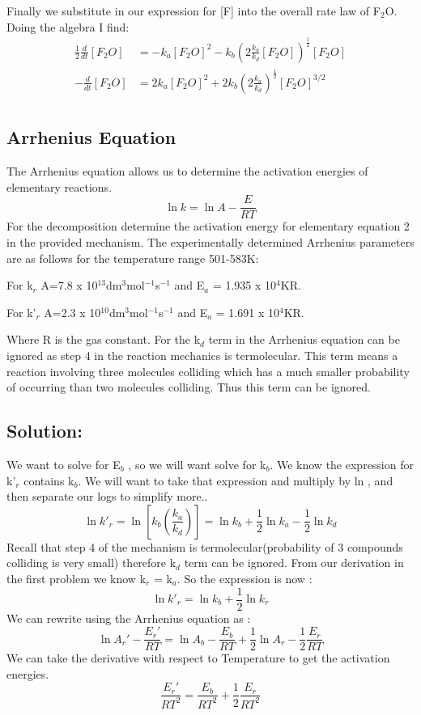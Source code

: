 \documentclass{article}
\newcommand{\be}{\begin{equation}}
\newcommand{\ee}{\end{equation}}
\begin{document}
Finally we substitute in our expression for [F] into the overall rate law of F$_2$O.  
Doing the algebra I find:
\be
\begin{split}
\frac{1}{2}\frac{d}{dt}[F_2O] &= -k_a[F_2O]^2 - k_b\left(2\frac{k_a}{k_d}[F_2O]\right)^{\frac{1}{2}} [F_2O] \\
-\frac{d}{dt}[F_2O] &= 2k_a[F_2O]^2 + 2k_b\left(2\frac{k_a}{k_d}\right)^{\frac{1}{2}} [F_2O]^{3/2} \\
\end{split}
\ee

\subsection{Arrhenius Equation}
The Arrhenius equation allows us to determine the activation energies of elementary reactions. 
\be
\ln k = \ln A -\frac{E}{RT}
\ee
For the decomposition determine the activation energy for elementary equation 2 in the provided mechanism. 
 The experimentally determined Arrhenius parameters are as follows for the temperature range 501-583K: 

\bigskip

For k$_r$ A=7.8 x 10$^{13}$dm$^3$mol$^{-1}$s$^{-1}$ and E$_a$ = 1.935 x 10$^4$KR. 

\bigskip

For k'$_r$ A=2.3 x 10$^{10}$dm$^3$mol$^{-1}$s$^{-1}$ and E$_a$ = 1.691 x 10$^4$KR. 

Where R is the gas constant.  
For the k$_d$ term in the Arrhenius equation can be ignored as step 4 in the reaction mechanics is termolecular. This term means a reaction involving three molecules colliding which has a much smaller probability of occurring than two molecules colliding. Thus this term can be ignored. 
\subsection*{Solution:}
We want to solve for E$_b$ , so we will want solve for k$_b$. We know the expression for k'$_r$ contains k$_b$. 
We will want to take that expression and multiply by ln , and then  separate our logs to simplify more..
\be
\ln k'_r = \ln \left[k_b\left(\frac{k_a}{k_d}\right)\right] = \ln k_b +\frac{1}{2}\ln k_a - \frac{1}{2}\ln k_d 
\ee
Recall that step 4 of the mechanism is termolecular(probability of 3 compounds colliding is very small) therefore k$_d$ term can be ignored. From our derivation in the first problem we know k$_r$ = k$_a$. So the expression is now : 
\be
\ln k'_r = \ln k_b +\frac{1}{2}\ln k_r
\ee
We can rewrite using the Arrhenius equation as : 
\be
\ln A_r'- \frac{E_r'}{RT}=\ln A_b - \frac{E_b}{RT} + \frac{1}{2}\ln A_r - \frac{1}{2}\frac{E_r}{RT}
\ee
We can take the derivative with respect to Temperature to get the activation energies. 
\be
\frac{E_r'}{RT^2}=\frac{E_b}{RT^2} +   \frac{1}{2}\frac{E_r}{RT^2}
\ee
\end{document}
